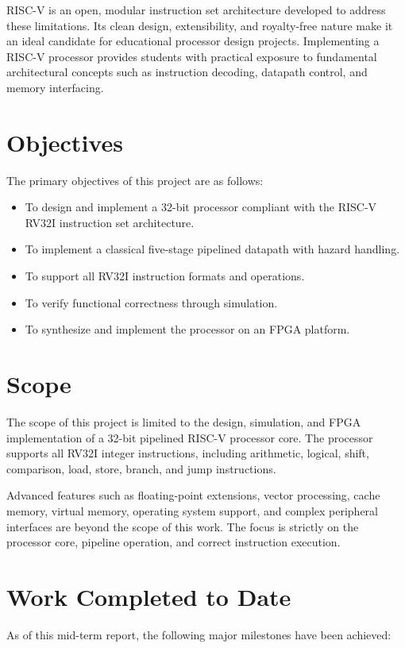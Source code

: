 \documentclass[12pt,a4paper]{report}
\begin{document}
RISC-V is an open, modular instruction set architecture developed to address these
limitations. Its clean design, extensibility, and royalty-free nature make it an ideal
candidate for educational processor design projects. Implementing a RISC-V processor
provides students with practical exposure to fundamental architectural concepts such as
instruction decoding, datapath control, and memory interfacing.

\section{Objectives}
The primary objectives of this project are as follows:

\begin{itemize}
    \item To design and implement a 32-bit processor compliant with the RISC-V RV32I
          instruction set architecture.
    \item To implement a classical five-stage pipelined datapath with hazard handling.
    \item To support all RV32I instruction formats and operations.
    \item To verify functional correctness through simulation.
    \item To synthesize and implement the processor on an FPGA platform.
\end{itemize}

\section{Scope}
The scope of this project is limited to the design, simulation, and FPGA implementation
of a 32-bit pipelined RISC-V processor core. The processor supports all RV32I integer
instructions, including arithmetic, logical, shift, comparison, load, store, branch,
and jump instructions.

Advanced features such as floating-point extensions, vector processing, cache memory,
virtual memory, operating system support, and complex peripheral interfaces are beyond
the scope of this work. The focus is strictly on the processor core, pipeline
operation, and correct instruction execution.

\section{Work Completed to Date}
As of this mid-term report, the following major milestones have been achieved:
\end{document}
